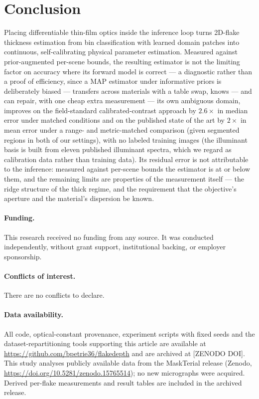 \documentclass[10pt]{article}
\begin{document}
\section{Conclusion}
Placing differentiable thin-film optics inside the inference loop turns 2D-flake thickness estimation from bin classification with learned domain patches into continuous, self-calibrating physical parameter estimation. Measured against prior-augmented per-scene bounds, the resulting estimator is not the limiting factor on accuracy where its forward model is correct --- a diagnostic rather than a proof of efficiency, since a MAP estimator under informative priors is deliberately biased --- transfers across materials with a table swap, knows --- and can repair, with one cheap extra measurement --- its own ambiguous domain, improves on the field-standard calibrated-contrast approach by $2.6\times$ in median error under matched conditions and on the published state of the art by $2\times$ in mean error under a range- and metric-matched comparison (given segmented regions in both of our settings), with no labeled training images (the illuminant basis is built from eleven published illuminant spectra, which we regard as calibration data rather than training data). Its residual error is not attributable to the inference: measured against per-scene bounds the estimator is at or below them, and the remaining limits are properties of the measurement itself --- the ridge structure of the thick regime, and the requirement that the objective's aperture and the material's dispersion be known.

\paragraph{Funding.} This research received no funding from any source. It was conducted independently, without grant support, institutional backing, or employer sponsorship.

\paragraph{Conflicts of interest.} There are no conflicts to declare.

\paragraph{Data availability.} All code, optical-constant provenance, experiment scripts with fixed seeds and the dataset-repartitioning tools supporting this article are available at \url{https://github.com/bpetrie36/flakedepth} and are archived at [ZENODO DOI]. This study analyses publicly available data from the MaskTerial release (Zenodo, \url{https://doi.org/10.5281/zenodo.15765514}); no new micrographs were acquired. Derived per-flake measurements and result tables are included in the archived release.
\end{document}
